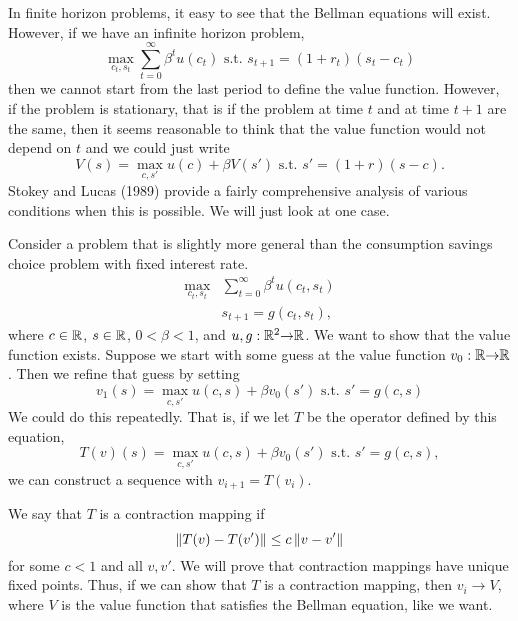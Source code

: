 In finite horizon problems, it easy to see that the
Bellman equations will exist. However, if we have an infinite horizon
problem, 
\[ \max_{c_t,s_t} \sum_{t=0}^\infty \beta^t u(c_t) \text{ s.t. } s_{t+1} =
(1+r_t) (s_t - c_t) \]
then we cannot start from the last period to define the value
function. However, if the problem is stationary, that is if the
problem at time $t$ and at time $t+1$ are the same, then it seems
reasonable to think that the value function would not depend on $t$
and we could just write 
\[ V(s) = \max_{c,s'} u(c) + \beta V(s') \text{ s.t. } s' =
(1+r)(s-c). \]
Stokey and Lucas (1989) provide a fairly comprehensive analysis of
various conditions when this is possible. We will just look at one
case. 

Consider a problem that is slightly more general than the consumption
savings choice problem with fixed interest rate.
\begin{align*}
  \max_{c_t,s_t} & \sum_{t=0}^\infty \beta^t u(c_t,s_t) \\
  & s_{t+1} = g(c_t,s_t),
\end{align*}
where $c \in \mathbb{R}$, $s \in \mathbb{R}$, $0<\beta<1$, and $u,g:\mathbb{R}^2 {\rightarrow} \mathbb{R}$.
We want to show that the value function exists. Suppose we start with
some guess at the value function $v_0:\mathbb{R}{\rightarrow} \mathbb{R}$. Then we refine that guess by
setting 
\[ v_1(s) = \max_{c,s'} u(c,s) + \beta v_0(s') \text{ s.t. }
s'=g(c,s) \]
We could do this repeatedly. That is, if we let $T$ be the operator
defined by this equation,
\[ T(v)(s) = \max_{c,s'} u(c,s) + \beta v_0(s') \text{ s.t. }
s'=g(c,s), \]
we can construct a sequence with $v_{i+1} = T(v_i)$. 

We say that $T$ is a contraction mapping if 
\[ \left\Vert {T(v) - T(v')} \right\Vert \leq c \left\Vert {v-v'} \right\Vert \] for some $c<1$ and all
$v,v'$. We will prove that contraction mappings have unique fixed
points. Thus, if we can show that $T$ is a contraction mapping, then
$v_i \to V$, where $V$ is the value function that satisfies the
Bellman equation, like we want.

